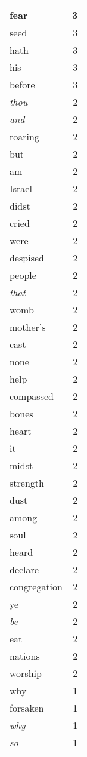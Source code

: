 \begin{center}
\begin{longtable}{l|r}
fear & 3 \\ \hline
seed & 3 \\ \hline
hath & 3 \\ \hline
his & 3 \\ \hline
before & 3 \\ \hline
\emph{thou} & 2 \\ \hline
\emph{and} & 2 \\ \hline
roaring & 2 \\ \hline
but & 2 \\ \hline
am & 2 \\ \hline
Israel & 2 \\ \hline
didst & 2 \\ \hline
cried & 2 \\ \hline
were & 2 \\ \hline
despised & 2 \\ \hline
people & 2 \\ \hline
\emph{that} & 2 \\ \hline
womb & 2 \\ \hline
mother's & 2 \\ \hline
cast & 2 \\ \hline
none & 2 \\ \hline
help & 2 \\ \hline
compassed & 2 \\ \hline
bones & 2 \\ \hline
heart & 2 \\ \hline
it & 2 \\ \hline
midst & 2 \\ \hline
strength & 2 \\ \hline
dust & 2 \\ \hline
among & 2 \\ \hline
soul & 2 \\ \hline
heard & 2 \\ \hline
declare & 2 \\ \hline
congregation & 2 \\ \hline
ye & 2 \\ \hline
\emph{be} & 2 \\ \hline
eat & 2 \\ \hline
nations & 2 \\ \hline
worship & 2 \\ \hline
why & 1 \\ \hline
forsaken & 1 \\ \hline
\emph{why} & 1 \\ \hline
\emph{so} & 1 \\ \hline

\end{longtable}
\end{center}
